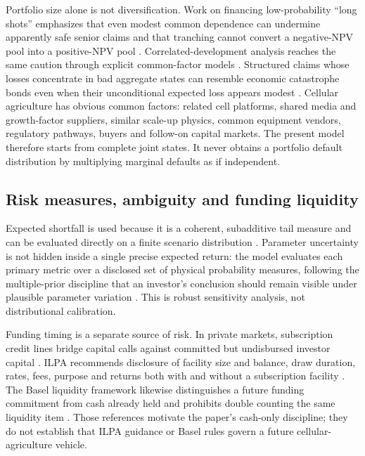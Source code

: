 \documentclass[11pt,a4paper]{article}
\begin{document}
Portfolio size alone is not diversification. Work on financing low-probability ``long shots'' emphasizes that even modest common dependence can undermine apparently safe senior claims and that tranching cannot convert a negative-NPV pool into a positive-NPV pool \citep{hull2019longshots}. Correlated-development analysis reaches the same caution through explicit common-factor models \citep{lo2021correlated}. Structured claims whose losses concentrate in bad aggregate states can resemble economic catastrophe bonds even when their unconditional expected loss appears modest \citep{coval2009catastrophe}. Cellular agriculture has obvious common factors: related cell platforms, shared media and growth-factor suppliers, similar scale-up physics, common equipment vendors, regulatory pathways, buyers and follow-on capital markets. The present model therefore starts from complete joint states. It never obtains a portfolio default distribution by multiplying marginal defaults as if independent.

\subsection{Risk measures, ambiguity and funding liquidity}

Expected shortfall is used because it is a coherent, subadditive tail measure and can be evaluated directly on a finite scenario distribution \citep{artzner1999coherent,rockafellar2000cvar}. Parameter uncertainty is not hidden inside a single precise expected return: the model evaluates each primary metric over a disclosed set of physical probability measures, following the multiple-prior discipline that an investor's conclusion should remain visible under plausible parameter variation \citep{garlappi2007multiprior}. This is robust sensitivity analysis, not distributional calibration.

Funding timing is a separate source of risk. In private markets, subscription credit lines bridge capital calls against committed but undisbursed investor capital \citep{bis2021privatemarkets}. ILPA recommends disclosure of facility size and balance, draw duration, rates, fees, purpose and returns both with and without a subscription facility \citep{ilpa2020subscription}. The Basel liquidity framework likewise distinguishes a future funding commitment from cash already held and prohibits double counting the same liquidity item \citep{basel2019lcr40}. Those references motivate the paper's cash-only discipline; they do not establish that ILPA guidance or Basel rules govern a future cellular-agriculture vehicle.
\end{document}
